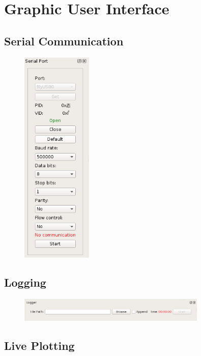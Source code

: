 \chapter{Graphic User Interface}
\label{chap:Graphic User Interface}

\section{Serial Communication}

\begin{figure}
\centering
\includegraphics[width=0.3\textwidth]{images/gui/serial-port}
\end{figure}

\section{Logging}

\begin{figure}
\centering
\includegraphics[width=0.8\textwidth]{images/gui/logger}
\end{figure}

\section{Live Plotting}

